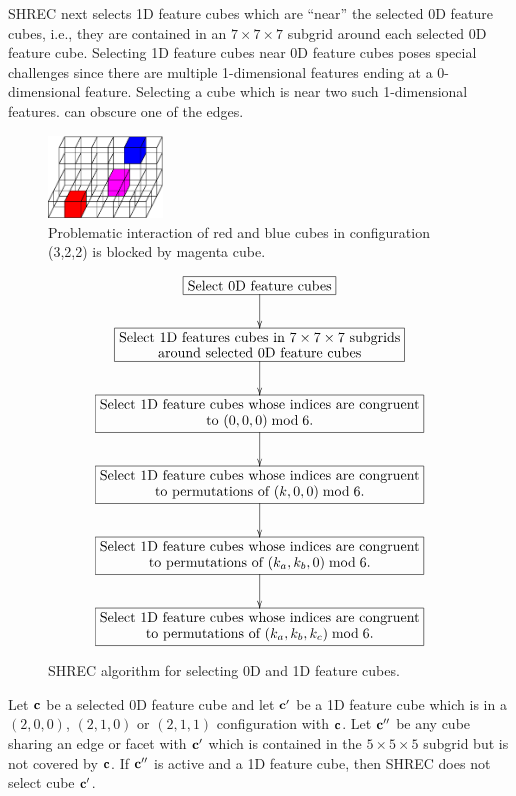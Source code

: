 SHREC next selects 1D feature cubes which are ``near'' 
the selected 0D feature cubes,
i.e., they are contained in an $7 \times 7 \times 7$ subgrid
around each selected 0D feature cube.
Selecting 1D feature cubes near 0D feature cubes poses special challenges
since there are multiple 1-dimensional features ending 
at a 0-dimensional feature.
Selecting a cube which is near two such 1-dimensional features.
can obscure one of the edges.


\begin{figure}[t]
\centering

\includegraphics[width=1.2in]{images/config3D_3_2_2_B.eps}

\caption{Problematic interaction of red and blue cubes
in configuration (3,2,2) is blocked by magenta cube.}
\label{fig:blocked3D}
\end{figure}

\begin{figure}
\begin{equation*}
\xymatrix{
\action{Select 0D feature cubes} \ar[d] \\
\action{Select 1D features cubes in $7 \times 7 \times 7$ subgrids \\
around selected 0D feature cubes} \ar[d] \\
\action{Select 1D feature cubes whose indices are congruent \\
to $(0,0,0) \bmod 6$.} \ar[d] \\
\action{Select 1D feature cubes whose indices are congruent \\
to permutations of $(k,0,0) \bmod 6$.} \ar[d] \\
\action{Select 1D feature cubes whose indices are congruent \\
to permutations of $(k_a,k_b,0) \bmod 6$.} \ar[d] \\
\action{Select 1D feature cubes whose indices are congruent \\
to permutations of $(k_a,k_b,k_c) \bmod 6$.}
}
\end{equation*}
\caption{SHREC algorithm for selecting 0D and 1D feature cubes.}
\label{alg:SHREC_select}
\end{figure}

Let $\mathbf{c}$ be a selected 0D feature cube and let $\mathbf{c}'$ be a 1D feature cube
which is in a $(2,0,0)$, $(2,1,0)$ or $(2,1,1)$ configuration with $\mathbf{c}$.
Let $\mathbf{c}''$ be any cube sharing an edge or facet with $\mathbf{c}'$
which is contained in the $5 \times 5 \times 5$ subgrid
but is not covered by $\mathbf{c}$.
If $\mathbf{c}''$ is active and a 1D feature cube,
then SHREC does not select cube $\mathbf{c}'$.

